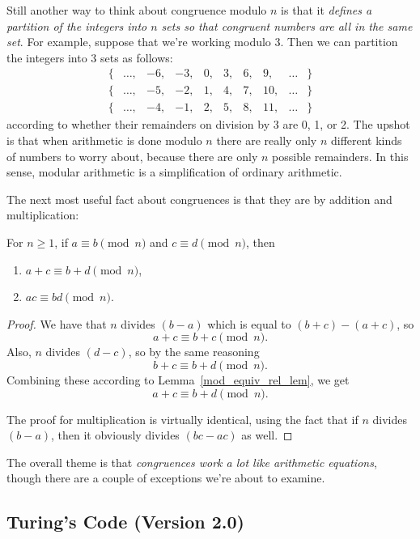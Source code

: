 Still another way to think about congruence modulo $n$ is that it
\emph{defines a partition of the integers into $n$ sets so that congruent
numbers are all in the same set}.  For example, suppose that we're working
modulo 3.  Then we can partition the integers into 3 sets as follows:
%
\[
\begin{array}{cccccccccc}
\{ & \dots, & -6, & -3, & 0, & 3, & 6, & 9, & \dots & \} \\
\{ & \dots, & -5, & -2, & 1, & 4, & 7, & 10, & \dots & \} \\
\{ & \dots, & -4, & -1, & 2, & 5, & 8, & 11, & \dots & \}
\end{array}
\]
according to whether their remainders on division by 3 are 0, 1, or 2.
The upshot is that when arithmetic is done modulo $n$ there are really
only $n$ different kinds of numbers to worry about, because there are only
$n$ possible remainders.  In this sense, modular arithmetic is a
simplification of ordinary arithmetic.\iffalse
 and thus is a good reasoning tool.\fi


The next most useful fact about congruences is that they are
 by addition and multiplication:

\begin{lemma}\label{mod_congruence_lem} For $n \geq 1$, if
$a \equiv b \pmod{n}$ and $c \equiv d \pmod{n}$, then
\begin{enumerate}
\item $a + c \equiv b + d \pmod{n}$,
\item $a c \equiv b d \pmod{n}$.
\end{enumerate}
\end{lemma}

\begin{proof}
We have that $n$ divides $(b-a)$ which is equal to $(b+c)-(a+c)$, so
\[
a+c \equiv b+c \pmod{n}.
\]
Also, $n$ divides $(d-c)$, so by the same reasoning
\[
b + c \equiv b + d \pmod{n}.
\]
Combining these according to Lemma~\ref{mod_equiv_rel_lem}, we get
\[
a + c  \equiv b + d \pmod{n}.
\]
 
The proof for multiplication is virtually identical, using the fact
that if $n$ divides $(b-a)$, then it obviously divides $(bc-ac)$ as
well.
\end{proof}

The overall theme is that \emph{congruences work a lot like arithmetic
  equations}, though there are a couple of exceptions we're about to
examine.

\subsection{Turing's Code (Version 2.0)}

